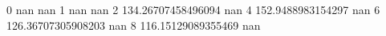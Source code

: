 0 nan nan
1 nan nan
2 134.26707458496094 nan
4 152.9488983154297 nan
6 126.36707305908203 nan
8 116.15129089355469 nan
